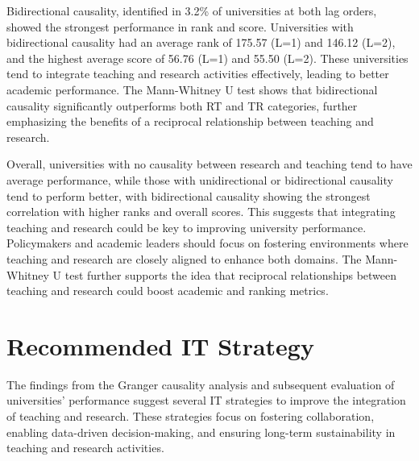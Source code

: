 \documentclass[conference]{IEEEtran}
\begin{document}
Bidirectional causality, identified in 3.2\% of universities at both lag orders, showed the strongest performance in rank and score. Universities with bidirectional causality had an average rank of 175.57 (L=1) and 146.12 (L=2), and the highest average score of 56.76 (L=1) and 55.50 (L=2). These universities tend to integrate teaching and research activities effectively, leading to better academic performance. The Mann-Whitney U test shows that bidirectional causality significantly outperforms both RT and TR categories, further emphasizing the benefits of a reciprocal relationship between teaching and research.

Overall, universities with no causality between research and teaching tend to have average performance, while those with unidirectional or bidirectional causality tend to perform better, with bidirectional causality showing the strongest correlation with higher ranks and overall scores. This suggests that integrating teaching and research could be key to improving university performance. Policymakers and academic leaders should focus on fostering environments where teaching and research are closely aligned to enhance both domains. The Mann-Whitney U test further supports the idea that reciprocal relationships between teaching and research could boost academic and ranking metrics.

\section{Recommended IT Strategy}
\label{sec:recommended_it_strategy}

The findings from the Granger causality analysis and subsequent evaluation of universities' performance suggest several IT strategies to improve the integration of teaching and research. These strategies focus on fostering collaboration, enabling data-driven decision-making, and ensuring long-term sustainability in teaching and research activities.
\end{document}
